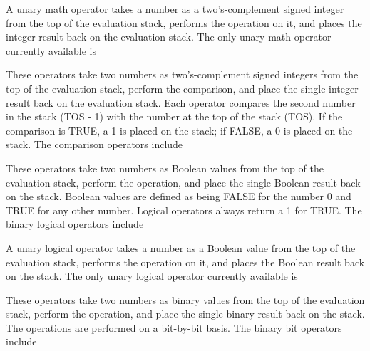  A unary math operator takes a number as
a two's-complement signed integer from the top of the evaluation stack,
performs the operation on it, and places the integer result back on the
evaluation stack. The only unary math operator currently available is

\medskip\begingroup\parskip=0pt
\endgroup

 These operators take two numbers as
two's-complement signed integers from the top of the evaluation stack,
perform the comparison, and place the single-integer result back on the
evaluation stack. Each operator compares the second number in the stack
(TOS - 1) with the number at the top of the stack (TOS). If the comparison
is TRUE, a 1 is placed on the stack; if FALSE, a 0 is placed on the stack.
The comparison operators include

\medskip\begingroup\parskip=0pt
\endgroup

 These operators take two numbers as
Boolean values from the top of the evaluation stack, perform the operation,
and place the single Boolean result back on the stack. Boolean values are
defined as being FALSE for the number 0 and TRUE for any other number.
Logical operators always return a 1 for TRUE. The binary logical operators
include

\medskip\begingroup\parskip=0pt
\endgroup

 A unary logical operator takes a
number as a Boolean value from the top of the evaluation stack, performs
the operation on it, and places the Boolean result back on the stack. The
only unary logical operator currently available is

\medskip\begingroup\parskip=0pt
\endgroup

 These operators take two numbers as
binary values from the top of the evaluation stack, perform the operation,
and place the single binary result back on the stack. The operations are
performed on a bit-by-bit basis. The binary bit operators include


